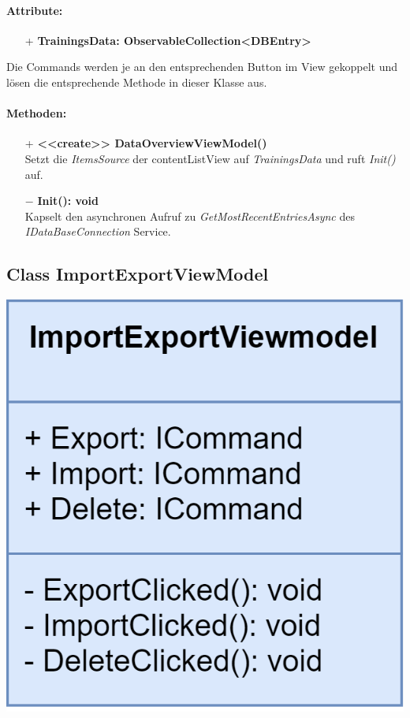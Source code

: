 \documentclass[a4paper,12pt]{article}
\begin{document}
\paragraph{Attribute:}
\begin{itemize}
	\item[+] \textbf{TrainingsData: ObservableCollection<DBEntry>}
\end{itemize}
Die Commands werden je an den entsprechenden Button im View gekoppelt und lösen die entsprechende Methode in dieser Klasse aus.
\paragraph{Methoden:}
\begin{itemize}
    \item[+] \textbf{<<create>> DataOverviewViewModel()} \\ Setzt die \textit{ItemsSource} der contentListView auf \textit{TrainingsData} und ruft \textit{Init()} auf.
    \item[$-$] \textbf{Init(): void} \\ Kapselt den asynchronen Aufruf zu \textit{GetMostRecentEntriesAsync} des \textit{IDataBaseConnection} Service.
\end{itemize} 

\begin{minipage}[t]{0.8\textwidth}

	\subsection{Class ImportExportViewModel}

\end{minipage}
\begin{minipage}[c]{0.2\textwidth}
	\includegraphics[width=\textwidth]{bilder/ViewModelKlassen/ImportExportViewModel}
\end{minipage}
\end{document}
